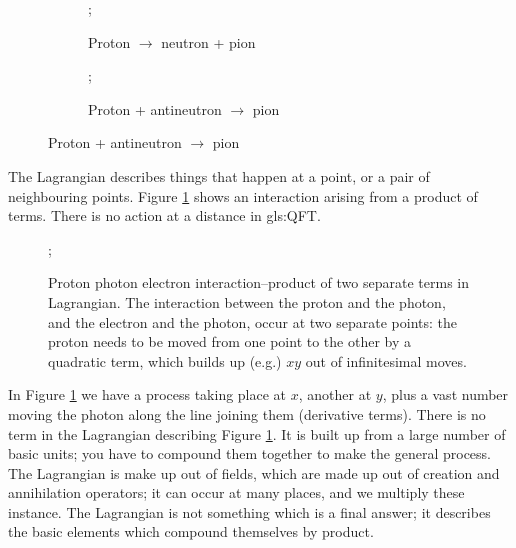 \documentclass[]{article}
\begin{document}
\begin{figure}[H]
	\caption{The same interaction can describe several processes: $\Psi^\dagger_n \pi^\dagger_+ \Psi_n$}
	\begin{subfigure}[p]{0.45\textwidth}
		\begin{center}
			\caption{Proton $\rightarrow$ neutron + pion}
			;
		\end{center}
	\end{subfigure}
	\hfill
	\begin{subfigure}[p]{0.45\textwidth}
		\begin{center}
			\caption{Proton + antineutron $\rightarrow$ pion}
			;
		\end{center}
	\end{subfigure}
\end{figure}

The Lagrangian describes things that happen at a point, or a pair of neighbouring points. Figure \ref{fig:proton:electron:photon} shows an interaction arising from a product of terms. There is no action at a distance in \glsdesc{gls:QFT}.
\begin{figure}[H]
	\begin{center}
		\caption[Proton photon electron interaction]{Proton photon electron interaction--product of two separate terms in Lagrangian. The interaction between the proton and the photon, and the electron and the photon, occur at two separate points: the proton needs to be moved from one point to the other by a quadratic term, which builds up (e.g.) $xy$ out of infinitesimal moves.}\label{fig:proton:electron:photon}
		;
	\end{center}
\end{figure}
 
In  Figure \ref{fig:proton:electron:photon} we have a process taking place at $x$, another at $y$, plus a vast number moving the photon along the line joining them (derivative terms). There is no term in the Lagrangian describing Figure \ref{fig:proton:electron:photon}. It is built up from a large number of basic units; you have to compound them together to make the general process. The Lagrangian is make up out of fields, which are made up out of creation and annihilation operators; it can occur at many places, and we multiply these  instance. The Lagrangian is not something which is a final answer; it describes the basic elements which compound themselves by product.
\end{document}
